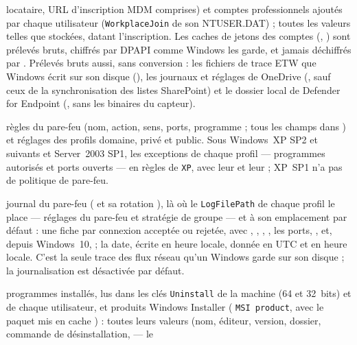\documentclass[11pt,a4paper,oneside]{report}
\begin{document}
\begin{description}[style=nextline,leftmargin=1.2em]
        locataire, URL d'inscription MDM comprises) et comptes professionnels
        ajoutés par chaque utilisateur (\texttt{WorkplaceJoin} de son
        NTUSER.DAT) ; toutes les valeurs telles que stockées,
         datant l'inscription. Les caches de jetons des
        comptes (, )
        sont prélevés bruts, chiffrés par DPAPI comme Windows les garde, et
        jamais déchiffrés par \wac{}. Prélevés bruts aussi, sans conversion :
        les fichiers de trace ETW que Windows écrit sur son disque
        (), les journaux et réglages de OneDrive
        (, sauf ceux de la synchronisation des listes
        SharePoint) et le dossier local de Defender for Endpoint
        (, sans les binaires du capteur).
  \item[\fichier{firewall.json}] règles du pare-feu (nom, action, sens, ports,
        programme ; tous les champs dans ) et réglages des profils
        domaine, privé et public. Sous Windows~XP SP2 et suivants et
        Server~2003 SP1, les exceptions de chaque profil --- programmes
        autorisés et ports ouverts --- en règles de 
        \texttt{XP}, avec leur  et leur  ; XP~SP1
        n'a pas de politique de pare-feu.
  \item[\fichier{firewall\_log.json}] journal du pare-feu
        ( et sa rotation ), là où le
        \texttt{LogFilePath} de chaque profil le place — réglages du pare-feu et
        stratégie de groupe — et à son emplacement par défaut : une fiche par
        connexion acceptée ou rejetée, avec , ,
        , , les ports,
        ,  et, depuis Windows~10,
         ; la date, écrite en heure locale, donnée en UTC et
        en heure locale. C'est la seule trace des flux réseau qu'un Windows
        garde sur son disque ; la journalisation est désactivée par défaut.
  \item[\fichier{installed\_programs.json}] programmes installés, lus dans les
        clés \texttt{Uninstall} de la machine (64 et 32~bits) et de chaque
        utilisateur, et produits Windows Installer ( \texttt{MSI
        product}, avec le paquet mis en cache ) : toutes leurs valeurs (nom, éditeur,
        version, dossier, commande de désinstallation,  --- le

\end{description}
\end{document}
